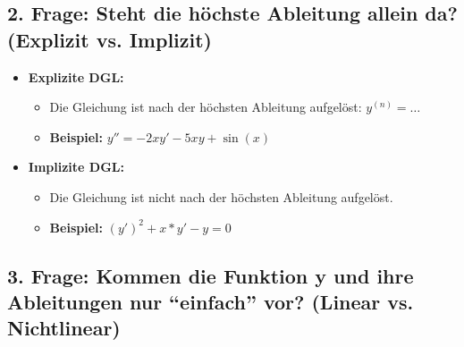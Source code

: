 \documentclass[a4paper,11pt,oneside,open=any,parskip=half, DIV=15]{scrreprt}
\begin{document}
   \subsection*{2. Frage: Steht die höchste Ableitung allein da? (Explizit vs. Implizit)}

      \begin{itemize}
         \item \textbf{Explizite DGL:}
         \begin{itemize}
            \item Die Gleichung ist nach der höchsten Ableitung aufgelöst: \(y^{(n)} = \ldots\)
            \item \textbf{Beispiel:} \(y'' = -2xy' - 5xy + \sin(x)\)
         \end{itemize}
         
         \item \textbf{Implizite DGL:}
         \begin{itemize}
            \item Die Gleichung ist nicht nach der höchsten Ableitung aufgelöst.
            \item \textbf{Beispiel:} \((y')^2 + x*y' - y = 0\) %
         \end{itemize}
      \end{itemize}

   \subsection*{3. Frage: Kommen die Funktion y und ihre Ableitungen nur ``einfach'' vor? (Linear vs. Nichtlinear)}
\end{document}

